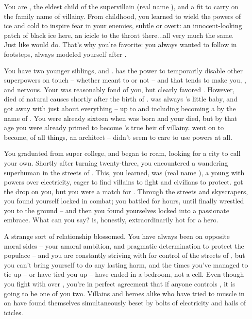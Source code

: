 \documentclass[char]{LRSguildcamp1}
\begin{document}
\name{\cOldest{}}

You are \cOldest{\intro}, the eldest child of the supervillain \cGrandma{\MYsupername} (real name \cGrandma{\intro}), and a \cOldest{\offspring} fit to carry on the family name of villainy.  
From childhood, you learned to wield the powers of ice and cold to inspire fear in your enemies, subtle or overt: an innocent-looking patch of black ice here, an icicle to the throat there...all very much the same. 
Just like \cGrandma{} would do.  That's why you're \cGrandma{\their} favorite: you always wanted to follow in \cGrandma{\their} footsteps, always modeled yourself after \cGrandma{\them}. %

You have two younger siblings, \cArchitect{} and \cYoungest{}.  \cArchitect{} has the power to temporarily disable other superpowers on touch -- whether \cArchitect{\they} meant to or not -- and that tends to make you, \cYoungest{}, and \cGrandma{} nervous.  Your \cGS{\parent} \cGS{\intro} was reasonably fond of you, but clearly favored \cArchitect{}.  However, \cGS{} died of natural causes shortly after the birth of \cYoungest{}. \cYoungest{} was always \cGrandma{}'s little baby, and got away with just about everything -- up to and including becoming a \cYoungest{\hero} by the name of \cYoungest{\MYsupername}.  You were already sixteen when \cYoungest{} was born and your \cGS{\parent} died, but by that age you were already primed to become \cGrandma{}'s true heir of villainy.  \cArchitect{} went on to become, of all things, an architect -- \cArchitect{\they} didn't seem to care to use \cArchitect{\their} powers at all.

You graduated from super college, and began to roam, looking for a city to call your own.  Shortly after turning twenty-three, you encountered a wandering superhuman in the streets of \pCityO{}.  This, you learned, was \cOS{\MYsupername} (real name \cOS{\intro}), a young \cOS{\hero} with powers over electricity, eager to find villains to fight and civilians to protect.  \cOS{\They} got the drop on you, but you were a match for \cOS{\them}.   Through the streets and skyscrapers, you found yourself locked in combat; you battled for hours, until \cOS{\they} finally wrestled you to the ground -- and then you found yourselves locked into a passionate embrace.  What can you say?  \cOS{} is, honestly, extraordinarily hot for a hero.

A strange sort of relationship blossomed.  You have always been on opposite moral sides -- your amoral ambition, and \cOS{\their} pragmatic determination to protect the populace -- and you are constantly striving with \cOS{\them} for control of the streets of \pCityO{}, but you can't bring yourself to do \cOS{\them} any lasting harm, and the times you've managed to tie \cOS{\them} up -- or \cOS{\they} have tied you up -- have ended in a bedroom, not a cell.
Even though you fight with \cOS{} over \pCityO{}, you're in perfect agreement that if anyone controls \pCityO{}, it is going to be one of you two.  Villains and heroes alike who have tried to muscle in on \pCityO{} have found themselves simultaneously beset by bolts of electricity and hails of icicles.
\end{document}

